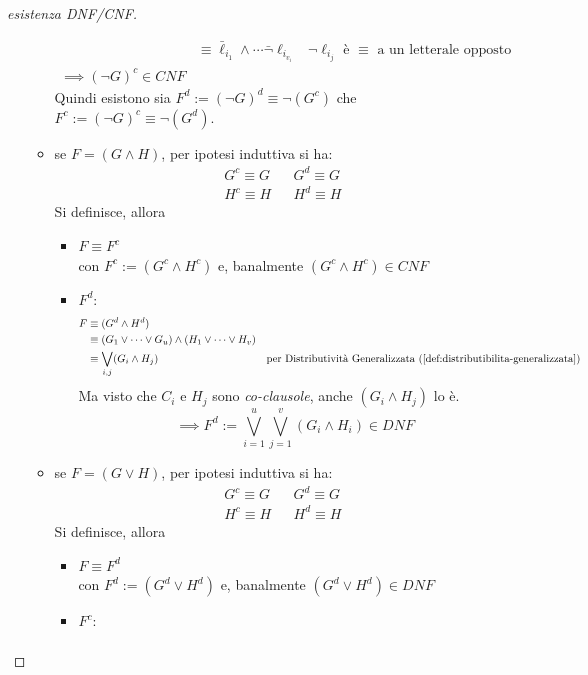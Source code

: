 \begin{proof}[esistenza DNF/CNF]
\begin{itemize}
\begin{itemize}
\begin{align*}
                               & \equiv \bar \ell_{i_1} \land \cdots \bar \neg \ell_{i_{v_i}} & \neg \ell_{i_j} \text{ è } \equiv \text{ a un letterale opposto} \\
          \implies (\neg G)^c \in CNF 
        \end{align*}
        Quindi esistono sia $F^d := (\neg G)^d \equiv \neg (G^c)$ che $F^c := (\neg G)^c \equiv \neg (G^d)$. 
      \item se $F = (G \land H)$, per ipotesi induttiva si ha:
        \begin{align*}
           G^c \equiv G && G^d \equiv G \\
           H^c \equiv H && H^d \equiv H
        \end{align*}
        Si definisce, allora
        \begin{itemize}
          \item $F \equiv F^c$ \\
                con $F^c := (G^c \land H^c)$ e, banalmente $(G^c \land H^c) \in CNF$
          \item $F^d$:
            \begin{align*}
              F & \equiv (G^d \land H^d) \\ 
                & \equiv (G_1 \lor \cdots \lor G_u) \land (H_1 \lor \cdots \lor H_v) \\
                & \equiv \bigvee\limits_{i,j}(G_i \land H_j) & \text{per Distributività Generalizzata}~(\ref{def:distributibilita-generalizzata})
            \end{align*}
            Ma visto che $C_i$ e $H_j$ sono \textit{co-clausole}, anche $(G_i \land H_j)$ lo è.
            $$
            \implies F^d := \bigvee\limits_{i=1}^u \bigvee\limits_{j=1}^v (G_i \land H_i) \in DNF
            $$
        \end{itemize}
      \item se $F = (G \lor H)$, per ipotesi induttiva si ha:
        \begin{align*}
          G^c \equiv G && G^d \equiv G \\
          H^c \equiv H && H^d \equiv H
        \end{align*}
        Si definisce, allora
        \begin{itemize}
          \item $F \equiv F^d$ \\
                con $F^d := (G^d \lor H^d)$ e, banalmente $(G^d \lor H^d) \in DNF$
          \item $F^c$:
            \begin{align*}

\end{align*}
\end{itemize}
\end{itemize}
\end{itemize}
\end{proof}
